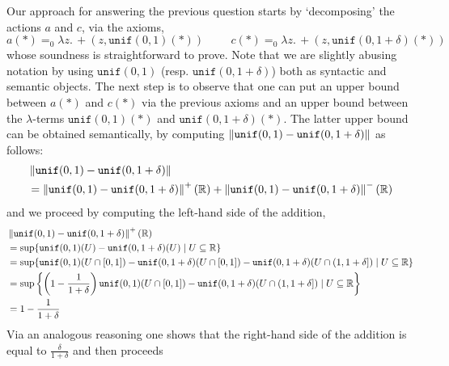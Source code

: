\documentclass[a4paper,UKenglish,cleveref, autoref, thm-restate]{lipics-v2021}
\begin{document}
\begin{example}
        Our approach for answering the previous question starts by
        `decomposing' the actions $a$ and $c$, via the axioms,
        \[
                a(\ast) =_0 \lambda z. \, +(z, \mathtt{unif}(0,1)(\ast))
                \hspace{1cm}
                c(\ast) =_0 \lambda z. \, +(z, \mathtt{unif}(0,1 + \delta)(\ast))
        \]
        whose soundness is straightforward to prove. Note that we are slightly
        abusing notation by using $\mathtt{unif}(0,1)$ (resp.
        $\mathtt{unif}(0,1+\delta)$) both as syntactic and semantic objects.
        The next step is to observe that  one can put an upper bound between
        $a(\ast)$ and $c(\ast)$ via the previous axioms and an upper bound
        between the $\lambda$-terms $\mathtt{unif}(0,1)(\ast)$ and
        $\mathtt{unif}(0,1+\delta)(\ast)$. The latter upper bound can be
        obtained semantically, by computing $\left\lVert  \mathtt{unif}(0,1) -
        \mathtt{unif}(0,1+\delta)  \right\rVert$ as follows:
        \begin{align*}
        & \left\lVert  \mathtt{unif}(0,1) - \mathtt{unif}(0,1+\delta)  \right\rVert
        \\
        & =
        \left\lVert  \mathtt{unif}(0,1) - \mathtt{unif}(0,1+\delta)  \right\rVert^+ (\mathbb{R})
        +
        \left\lVert  \mathtt{unif}(0,1) - \mathtt{unif}(0,1+\delta)  \right\rVert^- (\mathbb{R})
        \end{align*}
        and we proceed by computing the left-hand side of the addition,
        \begin{align*} 
        & \left\lVert  \mathtt{unif}(0,1) - \mathtt{unif}(0,1+\delta)  \right\rVert^+ (\mathbb{R})
        \\
        &  = 
        \sup \{ \mathtt{unif}(0,1)(U) - \mathtt{unif}(0,1 + \delta)(U)
        \mid U \subseteq \mathbb{R} \}
        \\
        & 
        =
        \sup \{ \mathtt{unif}(0,1)(U \cap [0,1]) 
        - \mathtt{unif}(0,1 + \delta)(U \cap [0,1]) 
        - \mathtt{unif}(0,1 + \delta)(U \cap (1,1 + \delta]) 
        \mid U \subseteq \mathbb{R} \}
        \\
        &
        = \sup \left \{ \left (1 - \frac{1}{1+\delta} \right ) 
                \mathtt{unif}(0,1)(U \cap [0,1]) 
        - \mathtt{unif}(0,1 + \delta)(U \cap (1,1 + \delta]) 
        \mid U \subseteq \mathbb{R} \right \}
        \\
        & = 1 - \frac{1}{1+\delta} 
        \end{align*}
        Via an analogous reasoning one shows that the right-hand side of the
        addition is equal to $\frac{\delta}{1 + \delta}$ and then proceeds

\end{example}
\end{document}
